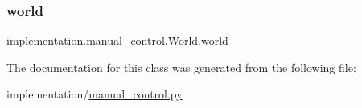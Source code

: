 \subsubsection{\texorpdfstring{world}{world}}
{\footnotesize\ttfamily implementation.\+manual\+\_\+control.\+World.\+world}



The documentation for this class was generated from the following file\+:\begin{DoxyCompactItemize}
\item 
implementation/\hyperlink{manual__control_8py}{manual\+\_\+control.\+py}\end{DoxyCompactItemize}
